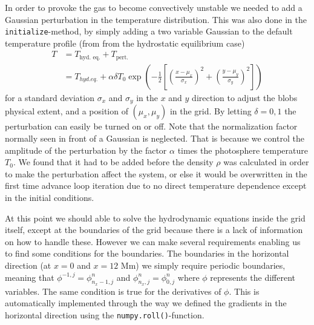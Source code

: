 \documentclass{emulateapj}
\begin{document}
	In order to provoke the gas to become convectively unstable we needed to add a Gaussian perturbation in the temperature distribution. This was also done in the \texttt{initialize}-method, by simply adding a two variable Gaussian to the default temperature profile (from from the hydrostatic equilibrium case)
	\begin{align}
		T &= T_\text{hyd. eq.} + T_\text{pert.} \nonumber\\
		&= T_{hyd. eq.} + \alpha \delta T_0 \exp(-\frac{1}{2}\left[\left(\frac{x - \mu_x}{\sigma_x}\right)^2 + \left(\frac{y - \mu_y}{\sigma_y}\right)^2\right])
		\nonumber
	\end{align}
	for a standard deviation $\sigma_x$ and $\sigma_y$ in the $x$ and $y$ direction to adjust the blobs physical extent, and a position of $(\mu_x, \mu_y)$ in the grid. By letting $\delta = 0, 1$ the perturbation can easily be turned on or off. Note that the normalization factor normally seen in front of a Gaussian is neglected. That is because we control the amplitude of the perturbation by the factor $\alpha$ times the photosphere temperature $T_0$. We found that it had to be added before the density $\rho$ was calculated in order to make the perturbation affect the system, or else it would be overwritten in the first time advance loop iteration due to no direct temperature dependence except in the initial conditions. 
	
	At this point we should able to solve the hydrodynamic equations inside the grid itself, except at the boundaries of the grid because there is a lack of information on how to handle these. However we can make several requirements enabling us to find some conditions for the boundaries. The boundaries in the horizontal direction (at $x=0$ and $x = 12$ Mm) we simply require periodic boundaries, meaning that $\phi^{-1, j} = \phi^n_{n_x-1, j}$ and $\phi^n_{n_x, j} = \phi^n_{0, j}$ where $\phi$ represents the different variables. The same condition is true for the derivatives of $\phi$. This is automatically implemented through the way we defined the gradients in the horizontal direction using the \texttt{numpy.roll()}-function.
	
\end{document}
